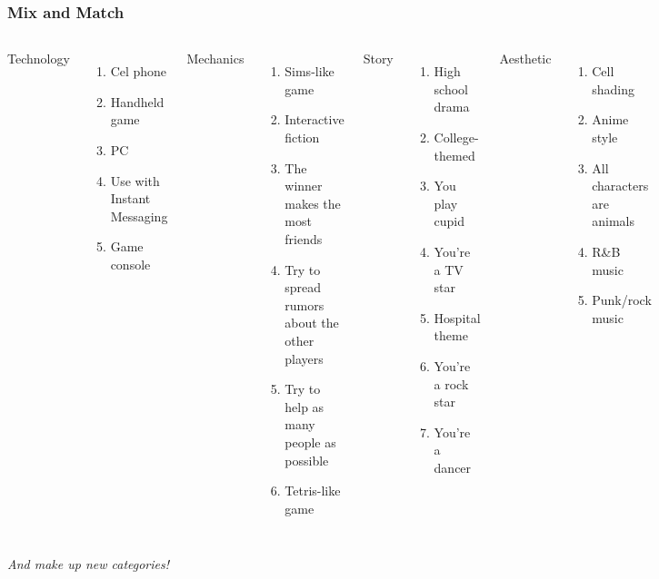 \documentclass{beamer}
\begin{document}
\begin{frame}
  \frametitle{Mix and Match}

\begin{columns}[t]
Technology
\begin{enumerate}\scriptsize
\item Cel phone
\item Handheld game
\item PC
\item Use with Instant Messaging
\item Game console
\end{enumerate}
Mechanics
\begin{enumerate}\scriptsize
\item Sims-like game
\item Interactive fiction
\item The winner makes the most friends
\item Try to spread rumors about the other players
\item Try to help as many people as possible
\item Tetris-like game
\end{enumerate}
Story
\begin{enumerate}\scriptsize
\item High school drama
\item College-themed
\item You play cupid
\item You're a TV star
\item Hospital theme
\item You're a rock star
\item You're a dancer
\end{enumerate}
Aesthetic
\begin{enumerate}\scriptsize
\item Cell shading
\item Anime style
\item All characters are animals
\item R\&B music
\item Punk/rock music
\end{enumerate}
\end{columns}
\pause
\hfill {\em And make up new categories!}

\end{frame}
\end{document}

